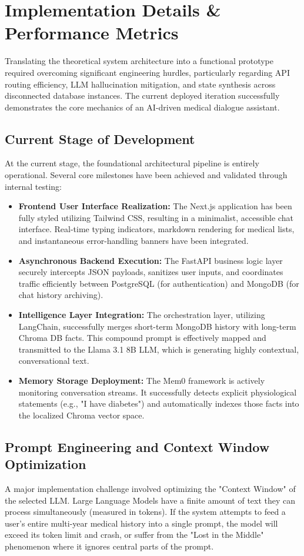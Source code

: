 \documentclass[12pt]{article}
\begin{document}
\newpage

\section{Implementation Details \& Performance Metrics}

Translating the theoretical system architecture into a functional prototype required overcoming significant engineering hurdles, particularly regarding API routing efficiency, LLM hallucination mitigation, and state synthesis across disconnected database instances. The current deployed iteration successfully demonstrates the core mechanics of an AI-driven medical dialogue assistant.

\subsection{Current Stage of Development}
At the current stage, the foundational architectural pipeline is entirely operational. Several core milestones have been achieved and validated through internal testing:
\begin{itemize}
    \item \textbf{Frontend User Interface Realization:} The Next.js application has been fully styled utilizing Tailwind CSS, resulting in a minimalist, accessible chat interface. Real-time typing indicators, markdown rendering for medical lists, and instantaneous error-handling banners have been integrated.
    \item \textbf{Asynchronous Backend Execution:} The FastAPI business logic layer securely intercepts JSON payloads, sanitizes user inputs, and coordinates traffic efficiently between PostgreSQL (for authentication) and MongoDB (for chat history archiving).
    \item \textbf{Intelligence Layer Integration:} The orchestration layer, utilizing LangChain, successfully merges short-term MongoDB history with long-term Chroma DB facts. This compound prompt is effectively mapped and transmitted to the Llama 3.1 8B LLM, which is generating highly contextual, conversational text.
    \item \textbf{Memory Storage Deployment:} The Mem0 framework is actively monitoring conversation streams. It successfully detects explicit physiological statements (e.g., "I have diabetes") and automatically indexes those facts into the localized Chroma vector space.
\end{itemize}

\subsection{Prompt Engineering and Context Window Optimization}
A major implementation challenge involved optimizing the "Context Window" of the selected LLM. Large Language Models have a finite amount of text they can process simultaneously (measured in tokens). If the system attempts to feed a user's entire multi-year medical history into a single prompt, the model will exceed its token limit and crash, or suffer from the "Lost in the Middle" phenomenon where it ignores central parts of the prompt.
\end{document}
